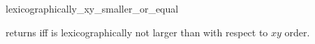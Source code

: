 \begin{ccRefFunction}{lexicographically_xy_smaller_or_equal}

{returns  iff  is lexicographically not larger
than  with respect to $xy$ order.}

\end{ccRefFunction}

